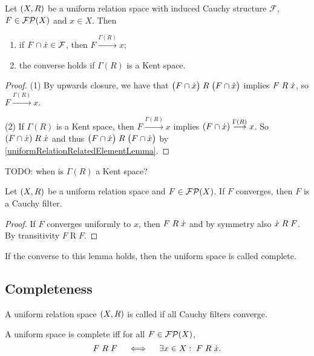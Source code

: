 \begin{lemma}
Let $\left( X,R \right)$ be a uniform relation space with induced Cauchy structure $\mathcal{F}$, $F\in \operatorname{\mathcal{FP}}(X)$ and $x\in X$. Then
\begin{enumerate}
\item if $F\cap\dot{x} \in \mathcal{F}$, then $F\overset{\Gamma(R)}{\longrightarrow} x$;
\item the converse holds if $\Gamma(R)$ is a Kent space.
\end{enumerate}
\end{lemma}
\begin{proof}
(1) By upwards closure, we have that $\big(F\cap \dot{x}\big)\mathrel{R}\big(F\cap \dot{x}\big)$ implies $F\mathrel{R}\dot{x}$, so $F\overset{\Gamma(R)}{\longrightarrow} x$.

(2) If $\Gamma(R)$ is a Kent space, then $F\overset{\Gamma(R)}{\longrightarrow} x$ implies $(F\cap\dot{x})\overset{\Gamma(R)}{\longrightarrow} x$. So $(F\cap\dot{x})\mathrel{R}\dot{x}$ and thus $\big(F\cap \dot{x}\big)\mathrel{R}\big(F\cap \dot{x}\big)$ by \ref{uniformRelationRelatedElementLemma}.
\end{proof}
TODO: when is $\Gamma(R)$ a Kent space?

\begin{lemma} \label{uniformlyConvergentImpliesCauchy}
Let $\left( X,R \right)$ be a uniform relation space and $F\in\operatorname{\mathcal{FP}}(X)$. If $F$ converges, then $F$ is a Cauchy filter.
\end{lemma}
\begin{proof}
If $F$ converges uniformly to $x$, then $F\mathrel{R}\dot{x}$ and by symmetry also $\dot{x}\mathrel{R}F$. By transitivity $F\mathrel{R}F$. 
\end{proof}
If the converse to this lemma holds, then the uniform space is called complete.

\subsection{Completeness}

\begin{definition}
A uniform relation space $\left( X,R \right)$ is called  if all Cauchy filters converge.
\end{definition}

A uniform space is complete iff for all $F\in\operatorname{\mathcal{FP}}(X)$,
\[ F\mathrel{R}F \quad\iff\quad \exists x\in X:\; F\mathrel{R}\dot{x}. \]

